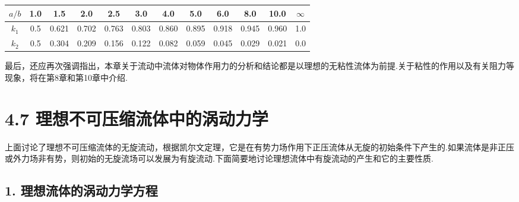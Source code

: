 \begin{center}
\begin{tabular}{|c|c|c|c|c|c|c|c|c|c|c|c|}
\hline
$a/b$ & 1.0 & 1.5 & 2.0 & 2.5 & 3.0 & 4.0 & 5.0 & 6.0 & 8.0 & 10.0 & $\infty$\\
\hline
$k_1$ & 0.5 & 0.621 & 0.702 & 0.763 & 0.803 & 0.860 & 0.895 & 0.918 & 0.945 & 0.960 & 1.0\\
\hline
$k_2$ & 0.5 & 0.304 & 0.209 & 0.156 & 0.122 & 0.082 & 0.059 & 0.045 & 0.029 & 0.021 & 0.0\\
\hline
\end{tabular}
\end{center}

最后，还应再次强调指出，本章关于流动中流体对物体作用力的分析和结论都是以理想的无粘性流体为前提.关于粘性的作用以及有关阻力等现象，将在第8章和第10章中介绍.

\section*{4.7  理想不可压缩流体中的涡动力学}

上面讨论了理想不可压缩流体的无旋流动，根据凯尔文定理，它是在有势力场作用下正压流体从无旋的初始条件下产生的.如果流体是非正压或外力场非有势，则初始的无旋流场可以发展为有旋流动.下面简要地讨论理想流体中有旋流动的产生和它的主要性质.

\subsection*{1. 理想流体的涡动力学方程}

